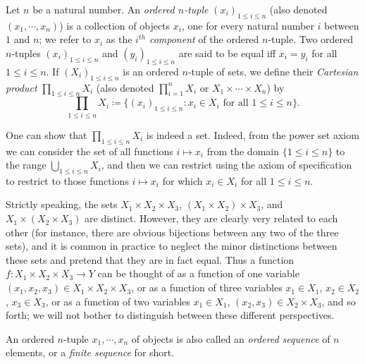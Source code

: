 \setcounter{theorem}{6}
\begin{definition}\label{3.5.7}
Let \(n\) be a natural number.
An \emph{ordered \(n\)-tuple} \((x_i)_{1 \leq i \leq n}\) (also denoted \((x_1, \cdots, x_n)\)) is a collection of objects \(x_i\), one for every natural number \(i\) between \(1\) and \(n\);
we refer to \(x_i\) as the \emph{\(i^{th}\) component} of the ordered \(n\)-tuple.
Two ordered \(n\)-tuples \((x_i)_{1 \leq i \leq n}\) and \((y_i)_{1 \leq i \leq n}\) are said to be equal iff \(x_i = y_i\) for all \(1 \leq i \leq n\).
If \((X_i)_{1 \leq i \leq n}\) is an ordered \(n\)-tuple of sets, we define their \emph{Cartesian product} \(\prod_{1 \leq i \leq n} X_i\) (also denoted \(\prod_{i=1}^n X_i\) or \(X_1 \times \cdots \times X_n\)) by
\[
    \prod_{1 \leq i \leq n} X_i \coloneqq \{(x_i)_{1 \leq i \leq n} : x_i \in X_i \text{ for all } 1 \leq i \leq n\}.
\]
\end{definition}

\begin{remark}\label{3.5.8}
One can show that \(\prod_{1 \leq i \leq n} X_i\) is indeed a set.
Indeed, from the power set axiom we can consider the set of all functions \(i \mapsto x_i\) from the domain \(\{1 \leq i \leq n\}\) to the range \(\bigcup_{1 \leq i \leq n} X_i\), and then we can restrict using the axiom of specification to restrict to those functions \(i \mapsto x_i\) for which \(x_i \in X_i\) for all \(1 \leq i \leq n\).
\end{remark}

\begin{note}
Strictly speaking, the sets \(X_1 \times X_2 \times X_3\), \((X_1 \times X_2) \times X_3\), and \(X_1 \times (X_2 \times X_3)\) are distinct.
However, they are clearly very related to each other (for instance, there are obvious bijections between any two of the three sets), and it is common in practice to neglect the minor distinctions between these sets and pretend that they are in fact equal.
Thus a function \(f : X_1 \times X_2 \times X_3 \to Y\) can be thought of as a function of one variable \((x_1, x_2, x_3) \in X_1 \times X_2 \times X_3\), or as a function of three variables \(x_1 \in X_1\), \(x_2 \in X_2\), \(x_3 \in X_3\), or as a function of two variables \(x_1 \in X_1\), \((x_2, x_3) \in X_2 \times X_3\), and so forth;
we will not bother to distinguish between these different perspectives.
\end{note}

\setcounter{theorem}{9}
\begin{remark}\label{3.5.10}
An ordered \(n\)-tuple \(x_1, \cdots, x_n\) of objects is also called an \emph{ordered sequence} of \(n\) elements, or a \emph{finite sequence} for short.
\end{remark}

